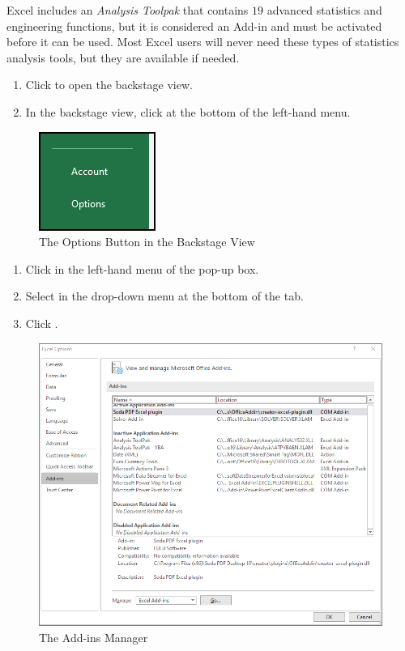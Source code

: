 Excel includes an \textit{Analysis Toolpak} that contains $ 19 $ advanced statistics and engineering functions, but it is considered an Add-in and must be activated before it can be used. Most Excel users will never need these types of statistics analysis tools, but they are available if needed.

\begin{enumerate}
	\item Click  to open the backstage view.
	\item In the backstage view, click  at the bottom of the left-hand menu.
	
\end{enumerate}

\begin{figure}[H]
	\centering
	\includegraphics[width=\maxwidth{.95\linewidth}]{gfx/ch09_fig50}
	\caption{The Options Button in the Backstage View}
	\label{09:fig50}
\end{figure}

\begin{enumerate}[resume]	
	
	\item Click  in the left-hand menu of the  pop-up box.
	\item Select  in the drop-down menu at the bottom of the  tab.
	\item Click .
	
\end{enumerate}

\begin{figure}[H]
	\centering
	\includegraphics[width=\maxwidth{.95\linewidth}]{gfx/ch09_fig51}
	\caption{The Add-ins Manager}
	\label{09:fig51}
\end{figure}


